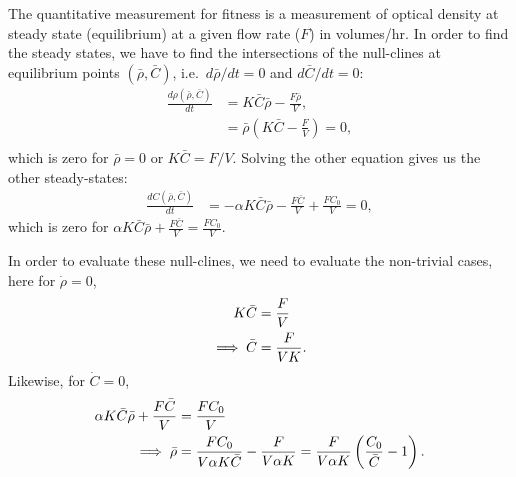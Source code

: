The quantitative measurement for fitness is a measurement of optical density at steady state (equilibrium) at a given flow rate ($F$) in volumes/hr.  In order to find the steady states, we have to find the intersections of the null-clines at equilibrium points $(\bar{\rho}, \bar{C})$, i.e.\ $d\bar{\rho}/dt = 0$ and $d\bar{C}/dt = 0$:
\begin{align*}
  \frac{d\rho(\bar{\rho}, \bar{C})}{dt} &= K\bar{C} \bar{\rho} - \frac{F\bar{\rho}}{V}, \\
  &= \bar{\rho} \left( K\bar{C} - \frac{F}{V} \right) = 0, \\
\end{align*}
which is zero for $\bar{\rho} = 0$ or $K \bar{C} = F/V$.  Solving the other equation gives us the other steady-states:
\begin{align*}
  \frac{dC(\bar{\rho}, \bar{C})}{dt} &= -\alpha K \bar{C} \bar{\rho} - \frac{F\bar{C}}{V} + \frac{FC_0}{V} = 0,
\end{align*}
which is zero for $\alpha K\bar{C} \bar{\rho} + \frac{F\bar{C}}{V} = \frac{FC_0}{V}$.

In order to evaluate these null-clines, we need to evaluate the non-trivial cases, here for $\dot{\rho} = 0$,
\begin{align}
  K \bar{C} &= \frac{F}{V} \notag \\
  \implies \bar{C} &= \frac{F}{VK}.
\end{align}
Likewise, for $\dot{C} = 0$,
\begin{align}
  \alpha K \bar{C} \bar{\rho} + \frac{F\bar{C}}{V} &= \frac{FC_0}{V} \notag \\
  \implies \bar{\rho} &= \frac{FC_0}{V \alpha K \bar{C}} - \frac{F}{V \alpha K} = \frac{F}{V \alpha K} \left(\frac{C_0}{\bar{C}} - 1 \right).
\end{align}

